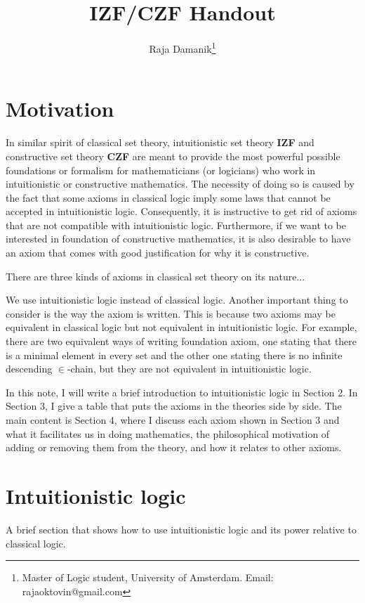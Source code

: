 \documentclass[12pt, a4paper]{article}
\title{{\bf IZF/CZF} Handout}
\author{Raja Damanik\footnote{Master of Logic student, University of Amsterdam. Email: rajaoktovin@gmail.com}}
\date{}
\theoremstyle{definition}
\theoremstyle{plain}
\begin{document}
\maketitle

\section{Motivation}

In similar spirit of classical set theory, intuitionistic set theory {\bf IZF} and constructive set theory {\bf CZF} are meant to provide the most powerful possible foundations or formalism for mathematicians (or logicians) who work in intuitionistic or constructive mathematics.
The necessity of doing so is caused by the fact that some axioms in classical logic imply some laws that cannot be accepted in intuitionistic logic.
Consequently, it is instructive to get rid of axioms that are not compatible with intuitionistic logic.
Furthermore, if we want to be interested in foundation of constructive mathematics, it is also desirable to have an axiom that comes with good justification for why it is constructive.

There are three kinds of axioms in classical set theory on its nature...


We use intuitionistic logic instead of classical logic.
Another important thing to consider is the way the axiom is written.
This is because two axioms may be equivalent in classical logic but not equivalent in intuitionistic logic. 
For example, there are two equivalent ways of writing foundation axiom, one stating that there is a minimal element in every set and the other one stating there is no infinite descending $\in$-chain, but they are not equivalent in intuitionistic logic.

In this note, I will write a brief introduction to intuitionistic logic in Section 2. In Section 3, I give a table that puts the axioms in the theories side by side. The main content is Section 4, where I discuss each axiom shown in Section 3 and what it facilitates us in doing mathematics, the philosophical motivation of adding or removing them from the theory, and how it relates to other axioms.

\section{Intuitionistic logic}

A brief section that shows how to use intuitionistic logic and its power relative to classical logic.
\end{document}
